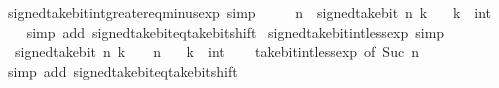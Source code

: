 \begin{isabellebody}
\endisatagproof
{\isafoldproof}%
%
\isadelimproof
\isanewline
%
\endisadelimproof
\isanewline
{}\isamarkupfalse%
\ signed{\isacharunderscore}{\kern0pt}take{\isacharunderscore}{\kern0pt}bit{\isacharunderscore}{\kern0pt}int{\isacharunderscore}{\kern0pt}greater{\isacharunderscore}{\kern0pt}eq{\isacharunderscore}{\kern0pt}minus{\isacharunderscore}{\kern0pt}exp\ {\isacharbrackleft}{\kern0pt}simp{\isacharbrackright}{\kern0pt}{\isacharcolon}{\kern0pt}\isanewline
\ \ {\isacartoucheopen}{\isacharminus}{\kern0pt}\ {\isacharparenleft}{\kern0pt}{}\ {\isacharcircum}{\kern0pt}\ n{\isacharparenright}{\kern0pt}\ {\isasymle}\ signed{\isacharunderscore}{\kern0pt}take{\isacharunderscore}{\kern0pt}bit\ n\ k{\isacartoucheclose}\isanewline
\ \ \ k\ {\isacharcolon}{\kern0pt}{\isacharcolon}{\kern0pt}\ int\isanewline
%
\isadelimproof
\ \ %
\endisadelimproof
%
\isatagproof
{}\isamarkupfalse%
\ {\isacharparenleft}{\kern0pt}simp\ add{\isacharcolon}{\kern0pt}\ signed{\isacharunderscore}{\kern0pt}take{\isacharunderscore}{\kern0pt}bit{\isacharunderscore}{\kern0pt}eq{\isacharunderscore}{\kern0pt}take{\isacharunderscore}{\kern0pt}bit{\isacharunderscore}{\kern0pt}shift{\isacharparenright}{\kern0pt}%
\endisatagproof
{\isafoldproof}%
%
\isadelimproof
\isanewline
%
\endisadelimproof
\isanewline
{}\isamarkupfalse%
\ signed{\isacharunderscore}{\kern0pt}take{\isacharunderscore}{\kern0pt}bit{\isacharunderscore}{\kern0pt}int{\isacharunderscore}{\kern0pt}less{\isacharunderscore}{\kern0pt}exp\ {\isacharbrackleft}{\kern0pt}simp{\isacharbrackright}{\kern0pt}{\isacharcolon}{\kern0pt}\isanewline
\ \ {\isacartoucheopen}signed{\isacharunderscore}{\kern0pt}take{\isacharunderscore}{\kern0pt}bit\ n\ k\ {\isacharless}{\kern0pt}\ {}\ {\isacharcircum}{\kern0pt}\ n{\isacartoucheclose}\isanewline
\ \ \ k\ {\isacharcolon}{\kern0pt}{\isacharcolon}{\kern0pt}\ int\isanewline
%
\isadelimproof
\ \ %
\endisadelimproof
%
\isatagproof
{}\isamarkupfalse%
\ take{\isacharunderscore}{\kern0pt}bit{\isacharunderscore}{\kern0pt}int{\isacharunderscore}{\kern0pt}less{\isacharunderscore}{\kern0pt}exp\ {\isacharbrackleft}{\kern0pt}of\ {\isacartoucheopen}Suc\ n{\isacartoucheclose}{\isacharbrackright}{\kern0pt}\isanewline
\ \ \isamarkupfalse%
\ {\isacharparenleft}{\kern0pt}simp\ add{\isacharcolon}{\kern0pt}\ signed{\isacharunderscore}{\kern0pt}take{\isacharunderscore}{\kern0pt}bit{\isacharunderscore}{\kern0pt}eq{\isacharunderscore}{\kern0pt}take{\isacharunderscore}{\kern0pt}bit{\isacharunderscore}{\kern0pt}shift{\isacharparenright}{\kern0pt}%

\end{isabellebody}
